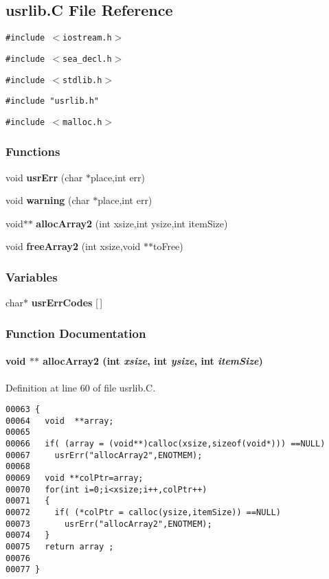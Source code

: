 \subsection{usrlib.C File Reference}
\label{usrlib.C}
{\tt \#include $<$iostream.h$>$}\par
{\tt \#include $<$sea\_\-decl.h$>$}\par
{\tt \#include $<$stdlib.h$>$}\par
{\tt \#include "usrlib.h"}\par
{\tt \#include $<$malloc.h$>$}\par
\subsubsection*{Functions}
\begin{CompactItemize}
\item 
void {\bf usr\-Err} (char $\ast$place,int err)
\item 
void {\bf warning} (char $\ast$place,int err)
\item 
void$\ast$$\ast$ {\bf alloc\-Array2} (int xsize,int ysize,int item\-Size)
\item 
void {\bf free\-Array2} (int xsize,void $\ast$$\ast$to\-Free)
\end{CompactItemize}
\subsubsection*{Variables}
\begin{CompactItemize}
\item 
char$\ast$ {\bf usr\-Err\-Codes} [$\,$]
\end{CompactItemize}


\subsubsection{Function Documentation}
\label{usrlib.C_a2}
\paragraph{\setlength{\rightskip}{0pt plus 5cm}void $\ast$$\ast$ alloc\-Array2 (int {\em xsize}, int {\em ysize}, int {\em item\-Size})}\hfill



Definition at line 60 of file usrlib.C.\small\begin{verbatim}00063 {
00064   void  **array;
00065 
00066   if( (array = (void**)calloc(xsize,sizeof(void*))) ==NULL)
00067     usrErr("allocArray2",ENOTMEM);
00068   
00069   void **colPtr=array;
00070   for(int i=0;i<xsize;i++,colPtr++)
00071   {
00072     if( (*colPtr = calloc(ysize,itemSize)) ==NULL)
00073       usrErr("allocArray2",ENOTMEM);
00074   }
00075   return array ;
00076 
00077 }
\end{verbatim}\normalsize 
\label{usrlib.C_a3}
